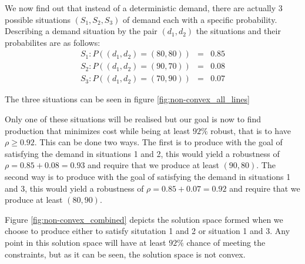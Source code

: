 \begin{example}
We now find out that instead of a deterministic demand, there are
actually 3 possible situations $(S_1, S_2, S_3)$
of demand each with a specific probability. Describing a demand
situation by the pair $(d_1, d_2)$ the situations and their
probabilites are as follows:
\begin{eqnarray}
S_1: P((d_1,d_2) = (80,80)) &=& 0.85\\
S_2: P((d_1,d_2) = (90,70)) &=& 0.08\\
S_3: P((d_1,d_2) = (70,90)) &=& 0.07
\end{eqnarray}

The three situations can be seen in figure \ref{fig:non-convex_all_lines}

Only one of these situations will be realised but our goal is now to
find production that minimizes cost while being at least $92\%$
robust, that is to have $\rho \geq 0.92$. This can be done two
ways. The first is to produce with the goal of satisfying the demand
in situations 1 and 2, this would yield a robustness of $\rho = 0.85+0.08 =
0.93$ and require that we produce at least $(90,80)$. The second way
is to produce with the goal of satisfying the demand in situations 1
and 3, this would yield a robustness of $\rho = 0.85+0.07 = 0.92$ and require
that we produce at least $(80,90)$.

Figure \ref{fig:non-convex_combined} depicts the solution space formed
when we choose to produce either to satisfy situtation 1 and 2 or
situation 1 and 3. Any point in this solution space will have at least
$92\%$ chance of meeting the constraints, but as it can be seen, the
solution space is not convex.
\end{example}

